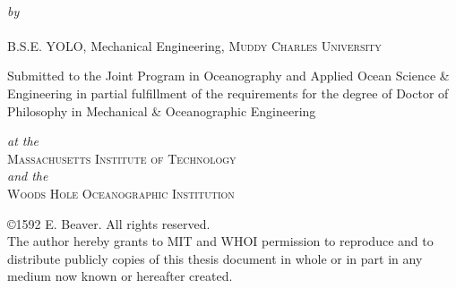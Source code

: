 \def\signature#1#2{\par\noindent#1\dotfill\null\\*
  {\raggedleft #2\par}}


\makeatletter

\begin{titlepage}
  \begin{center}
    \begin{Large}
      \@title
    \end{Large}\\[0.1em]
    \emph{\footnotesize by}\\
    {\large \@author} \\[-0.25em]
    B.S.E. YOLO, Mechanical Engineering, \textsc{Muddy Charles University} \\ [2em]
    \begin{singlespace}
    {Submitted to the Joint Program in Oceanography and Applied Ocean Science \& Engineering in partial fulfillment of the requirements for the degree of Doctor of Philosophy in Mechanical \& Oceanographic Engineering} \\
    \end{singlespace}
    \emph{\footnotesize at the}\\
    {\large \textsc{Massachusetts Institute of Technology}} \\
    \emph{\footnotesize and the}\\
    {\large \textsc{Woods Hole Oceanographic Institution}} \\ [2em]
    \begin{singlespace}
    {\copyright1592 E. Beaver. All rights reserved. \\ The author hereby grants to MIT and WHOI permission to reproduce and to distribute publicly copies of this thesis document in whole or in part in any medium now known or hereafter created.} \\ [2em]


\end{singlespace}
\end{center}
\end{titlepage}
